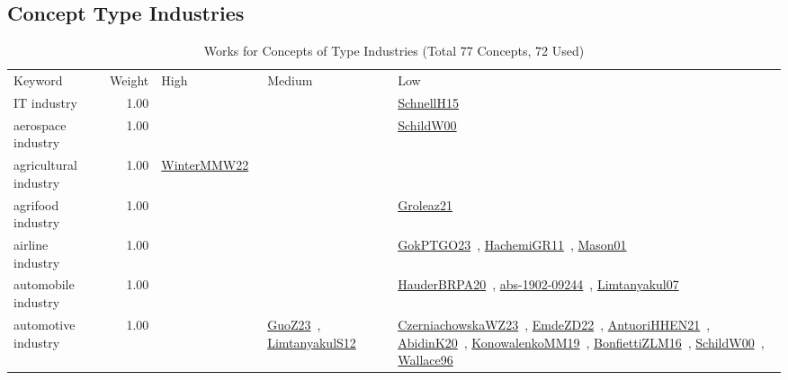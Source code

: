 \subsection{Concept Type Industries}
\label{sec:Industries}
\label{Industries}
{\scriptsize
\begin{longtable}{p{3cm}r>{\raggedright\arraybackslash}p{6cm}>{\raggedright\arraybackslash}p{6cm}>{\raggedright\arraybackslash}p{8cm}}
\rowcolor{white}\caption{Works for Concepts of Type Industries (Total 77 Concepts, 72 Used)}\\ \toprule
\rowcolor{white}Keyword & Weight & High & Medium & Low\\ \midrule\endhead
\bottomrule
\endfoot
\index{IT industry}\index{Industries!IT industry}IT industry &  1.00 &  &  & \href{../works/SchnellH15.pdf}{SchnellH15}~\cite{SchnellH15}\\
\index{aerospace industry}\index{Industries!aerospace industry}aerospace industry &  1.00 &  &  & \href{../works/SchildW00.pdf}{SchildW00}~\cite{SchildW00}\\
\index{agricultural industry}\index{Industries!agricultural industry}agricultural industry &  1.00 & \href{../works/WinterMMW22.pdf}{WinterMMW22}~\cite{WinterMMW22} &  & \\
\index{agrifood industry}\index{Industries!agrifood industry}agrifood industry &  1.00 &  &  & \href{../works/Groleaz21.pdf}{Groleaz21}~\cite{Groleaz21}\\
\index{airline industry}\index{Industries!airline industry}airline industry &  1.00 &  &  & \href{../works/GokPTGO23.pdf}{GokPTGO23}~\cite{GokPTGO23}, \href{../works/HachemiGR11.pdf}{HachemiGR11}~\cite{HachemiGR11}, \href{../works/Mason01.pdf}{Mason01}~\cite{Mason01}\\
\index{automobile industry}\index{Industries!automobile industry}automobile industry &  1.00 &  &  & \href{../works/HauderBRPA20.pdf}{HauderBRPA20}~\cite{HauderBRPA20}, \href{../works/abs-1902-09244.pdf}{abs-1902-09244}~\cite{abs-1902-09244}, \href{../works/Limtanyakul07.pdf}{Limtanyakul07}~\cite{Limtanyakul07}\\
\index{automotive industry}\index{Industries!automotive industry}automotive industry &  1.00 &  & \href{../works/GuoZ23.pdf}{GuoZ23}~\cite{GuoZ23}, \href{../works/LimtanyakulS12.pdf}{LimtanyakulS12}~\cite{LimtanyakulS12} & \href{../works/CzerniachowskaWZ23.pdf}{CzerniachowskaWZ23}~\cite{CzerniachowskaWZ23}, \href{../works/EmdeZD22.pdf}{EmdeZD22}~\cite{EmdeZD22}, \href{../works/AntuoriHHEN21.pdf}{AntuoriHHEN21}~\cite{AntuoriHHEN21}, \href{../works/AbidinK20.pdf}{AbidinK20}~\cite{AbidinK20}, \href{../works/KonowalenkoMM19.pdf}{KonowalenkoMM19}~\cite{KonowalenkoMM19}, \href{../works/BonfiettiZLM16.pdf}{BonfiettiZLM16}~\cite{BonfiettiZLM16}, \href{../works/SchildW00.pdf}{SchildW00}~\cite{SchildW00}, \href{../works/Wallace96.pdf}{Wallace96}~\cite{Wallace96}\\

\end{longtable}}

